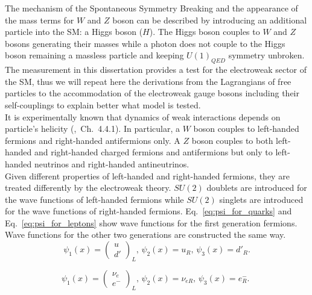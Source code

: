 The mechanism of the Spontaneous Symmetry Breaking and the appearance of the mass terms for $W$ and $Z$ boson can be described by introducing an additional particle into the SM: a Higgs boson ($H$). The Higgs boson couples to $W$ and $Z$ bosons generating their masses while a photon does not couple to the Higgs boson remaining a massless particle and keeping $U(1)_{QED}$ symmetry unbroken.\\

The measurement in this dissertation provides a test for the electroweak sector of the SM, thus we will repeat here the derivations from the Lagrangians of free particles to the accommodation of the electroweak gauge bosons including their self-couplings to explain better what model is tested.\\

It is experimentally known that dynamics of weak interactions depends on particle's helicity (\cite{ref_Griffiths},~Ch.~4.4.1). In particular, a $W$ boson couples to left-handed fermions and right-handed antifermions only. A $Z$ boson couples to both left-handed and right-handed charged fermions and antifermions but only to left-handed neutrinos and right-handed antineutrinos. \\

Given different properties of left-handed and right-handed fermions, they are treated differently by the electroweak theory. $SU(2)$ doublets are introduced for the wave functions of left-handed fermions while $SU(2)$ singlets are introduced for the wave functions of right-handed fermions. Eq.~\ref{eq:psi_for_quarks} and Eq.~\ref{eq:psi_for_leptons} show wave functions for the first generation fermions. Wave functions for the other two generations are constructed the same way.\\ 
 
\begin{equation}\label{eq:psi_for_quarks}
\psi_1(x)=\begin{pmatrix} u \\ d' \end{pmatrix}_L \text{, } \psi_2(x)=u_R \text{, } \psi_3(x)=d'_R \text{.}
\end{equation}

\begin{equation}\label{eq:psi_for_leptons}
\psi_1(x)=\begin{pmatrix} \nu_e \\ e^- \end{pmatrix}_L \text{, } \psi_2(x)=\nu_{eR} \text{, } \psi_3(x)=e^-_R \text{. }
\end{equation}

